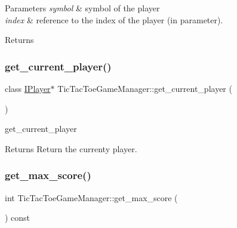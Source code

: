 \begin{DoxyParams}{Parameters}
{\em symbol} & symbol of the player \\
\hline
{\em index} & reference to the index of the player (in parameter). \\
\hline
\end{DoxyParams}
\begin{DoxyReturn}{Returns}

\end{DoxyReturn}
\mbox{\label{class_tic_tac_toe_game_manager_aacdb43d784567d95b535e66e91aca832}} 
\subsubsection{\texorpdfstring{get\+\_\+current\+\_\+player()}{get\_current\_player()}}
{\footnotesize\ttfamily class \hyperlink{class_i_player}{I\+Player}$\ast$ Tic\+Tac\+Toe\+Game\+Manager\+::get\+\_\+current\+\_\+player (\begin{DoxyParamCaption}{ }\end{DoxyParamCaption})\hspace{0.3cm}{\ttfamily [inline]}}



get\+\_\+current\+\_\+player 

\begin{DoxyReturn}{Returns}
Return the currenty player. 
\end{DoxyReturn}
\mbox{\label{class_tic_tac_toe_game_manager_a311fdd7f83b66a5cc7eeafe584455315}} 
\subsubsection{\texorpdfstring{get\+\_\+max\+\_\+score()}{get\_max\_score()}}
{\footnotesize\ttfamily int Tic\+Tac\+Toe\+Game\+Manager\+::get\+\_\+max\+\_\+score (\begin{DoxyParamCaption}{ }\end{DoxyParamCaption}) const\hspace{0.3cm}{\ttfamily [inline]}}




